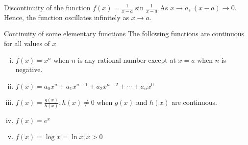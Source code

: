 \begin{example}{Discontinuity of the function $f(x) = \frac{1}{x-a}\sin{\frac{1}{x-a}}$}{}
    As $x \to a$, $(x-a) \to 0$. Hence, the function oscillates infinitely as $x \to a$.
\end{example}


\begin{theorem}{Continuity of some elementary functions}{}
    The following functions are continuous for all values of $x$ 
    \begin{enumerate}[(i)]
        \item $f(x) = x^n$ when $n$ is any rational number except at $x=a$ when $n$ is negative.
        \item $f(x) = a_0x^n + a_1x^{n-1} + a_2x^{n-2} + \cdots + a_nx^0$
        \item $f(x) = \frac{g(x)}{h(x)} ; h(x) \neq 0$ when $g(x)$ and $h(x)$ are continuous.
        \item $f(x)=e^x$
        \item $f(x)=\log{x}=\ln{x}; x>0$
    \end{enumerate}
\end{theorem}
